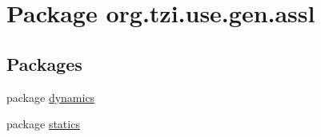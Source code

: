 \hypertarget{namespaceorg_1_1tzi_1_1use_1_1gen_1_1assl}{\section{Package org.\-tzi.\-use.\-gen.\-assl}
\label{namespaceorg_1_1tzi_1_1use_1_1gen_1_1assl}
}
\subsection*{Packages}
\begin{DoxyCompactItemize}
\item 
package \hyperlink{namespaceorg_1_1tzi_1_1use_1_1gen_1_1assl_1_1dynamics}{dynamics}
\item 
package \hyperlink{namespaceorg_1_1tzi_1_1use_1_1gen_1_1assl_1_1statics}{statics}
\end{DoxyCompactItemize}
